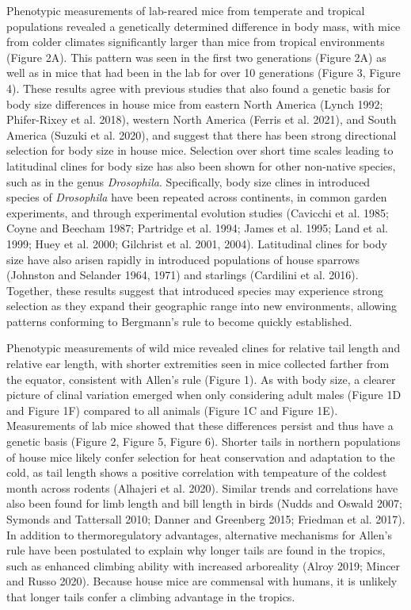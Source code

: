 \documentclass[]{article}
\begin{document}
Phenotypic measurements of lab-reared mice from temperate and tropical
populations revealed a genetically determined difference in body mass,
with mice from colder climates significantly larger than mice from
tropical environments (Figure 2A). This pattern was seen in the first
two generations (Figure 2A) as well as in mice that had been in the lab
for over 10 generations (Figure 3, Figure 4). These results agree with
previous studies that also found a genetic basis for body size
differences in house mice from eastern North America (Lynch 1992;
Phifer-Rixey et al. 2018), western North America (Ferris et al. 2021),
and South America (Suzuki et al. 2020), and suggest that there has been
strong directional selection for body size in house mice. Selection over
short time scales leading to latitudinal clines for body size has also
been shown for other non-native species, such as in the genus
\emph{Drosophila}. Specifically, body size clines in introduced species
of \emph{Drosophila} have been repeated across continents, in common
garden experiments, and through experimental evolution studies (Cavicchi
et al. 1985; Coyne and Beecham 1987; Partridge et al. 1994; James et al.
1995; Land et al. 1999; Huey et al. 2000; Gilchrist et al. 2001, 2004).
Latitudinal clines for body size have also arisen rapidly in introduced
populations of house sparrows (Johnston and Selander 1964, 1971) and
starlings (Cardilini et al. 2016). Together, these results suggest that
introduced species may experience strong selection as they expand their
geographic range into new environments, allowing patterns conforming to
Bergmann's rule to become quickly established.

Phenotypic measurements of wild mice revealed clines for relative tail
length and relative ear length, with shorter extremities seen in mice
collected farther from the equator, consistent with Allen's rule (Figure
1). As with body size, a clearer picture of clinal variation emerged
when only considering adult males (Figure 1D and Figure 1F) compared to
all animals (Figure 1C and Figure 1E). Measurements of lab mice showed
that these differences persist and thus have a genetic basis (Figure 2,
Figure 5, Figure 6). Shorter tails in northern populations of house mice
likely confer selection for heat conservation and adaptation to the
cold, as tail length shows a positive correlation with tempeature of the
coldest month across rodents (Alhajeri et al. 2020). Similar trends and
correlations have also been found for limb length and bill length in
birds (Nudds and Oswald 2007; Symonds and Tattersall 2010; Danner and
Greenberg 2015; Friedman et al. 2017). In addition to thermoregulatory
advantages, alternative mechanisms for Allen's rule have been postulated
to explain why longer tails are found in the tropics, such as enhanced
climbing ability with increased arboreality (Alroy 2019; Mincer and
Russo 2020). Because house mice are commensal with humans, it is
unlikely that longer tails confer a climbing advantage in the tropics.
\end{document}

